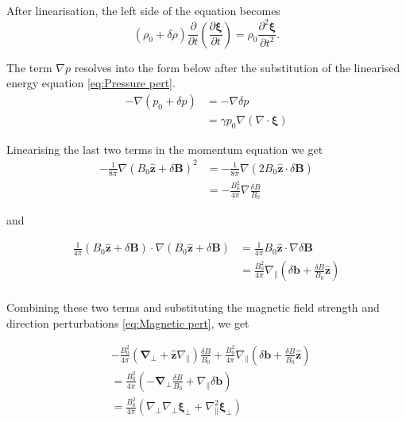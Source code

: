 After linearisation, the left side of the equation becomes
\begin{equation}
     (\rho_0 + \delta \rho) \frac{\partial }{\partial t} \left( \frac{\partial \boldsymbol{\xi}}{\partial t} \right)
    =  \rho_0\frac{\partial^2 \boldsymbol{\xi}}{\partial t^2}.
    \label{eq:Wave left}
\end{equation}

The term \(\nabla p\) resolves into the form below after the substitution of the linearised energy equation \eqref{eq:Pressure pert}.
\begin{equation}
 \begin{split}
    -\nabla(p_0+\delta p)
    &=-\nabla\delta p\\
    &= \gamma p_0\nabla(\nabla \cdot \boldsymbol{\xi})
    \label{eq:Wave right 1}
 \end{split}
\end{equation}

Linearising the last two terms in the momentum equation we get
\begin{equation*}
 \begin{split}
     - \frac{1}{8\pi}\nabla (B_0 \hat{\boldsymbol{z}}+ \delta\boldsymbol{B})^2
    &= - \frac{1}{8\pi}\nabla (2B_0\hat{\boldsymbol{z}}\cdot\delta\boldsymbol{B}) \\
    & = -\frac{B_0^2}{4\pi}\nabla \frac{\delta B}{B_0}
 \end{split}
\end{equation*}

and 

\begin{equation*}
 \begin{split}
    \frac{1}{4\pi}(B_0\hat{\boldsymbol{z}}+\delta \boldsymbol{B})\cdot \nabla(B_0\hat{\boldsymbol{z}}+\delta \boldsymbol{B}) 
    &= \frac{1}{4\pi}B_0\hat{\boldsymbol{z}}\cdot \nabla\delta \boldsymbol{B}\\
    &= \frac{B_0^2}{4\pi}\nabla_{\parallel} \left(\delta \boldsymbol{b} +\frac{\delta B}{B_0}\hat{\boldsymbol{z}} \right)\\
 \end{split}
\end{equation*}

Combining these two terms and substituting the magnetic field strength and direction perturbations \eqref{eq:Magnetic pert}, we get 

\begin{equation}
 \begin{split}
     &-\frac{B_0^2}{4\pi}(\boldsymbol{\nabla_{\perp} }+ \hat{\boldsymbol{z}} \nabla_{\parallel}) \frac{\delta B}{B_0} + \frac{B_0^2}{4\pi}\nabla_{\parallel} \left(\delta \boldsymbol{b} +\frac{\delta B}{B_0}\hat{\boldsymbol{z}} \right)\\
    &=  \frac{B_0^2}{4\pi} \left( -\boldsymbol{\nabla_{\perp} } \frac{\delta B}{B_0}+\nabla_{\parallel} \delta \boldsymbol{b} \right)\\
    &= \frac{B_0^2}{4\pi}(\nabla_{\perp}\nabla_{\perp} \boldsymbol{\xi}_{\perp} + \nabla_{\parallel}^2\boldsymbol{\xi}_{\perp})
    \label{eq:Wave right 2}
 \end{split}
\end{equation}

